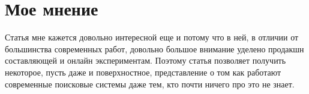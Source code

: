 \section*{Мое мнение}

Статья мне кажется довольно интересной еще и потому что в ней, в отличии от большинства современных работ, довольно большое внимание уделено продакшн составляющей и онлайн экспериментам.
Поэтому статья позволяет получить некоторое, пусть даже и поверхностное, представление о том как работают современные поисковые системы даже тем, кто почти ничего про это не знает.